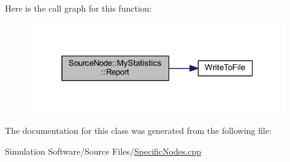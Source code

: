Here is the call graph for this function\+:
\nopagebreak
\begin{figure}[H]
\begin{center}
\leavevmode
\includegraphics[width=313pt]{class_source_node_1_1_my_statistics_a39931b0ce449658de7d6be309dca8eee_cgraph}
\end{center}
\end{figure}


The documentation for this class was generated from the following file\+:\begin{DoxyCompactItemize}
\item 
Simulation Software/\+Source Files/\hyperlink{_specific_nodes_8cpp}{Specific\+Nodes.\+cpp}\end{DoxyCompactItemize}
